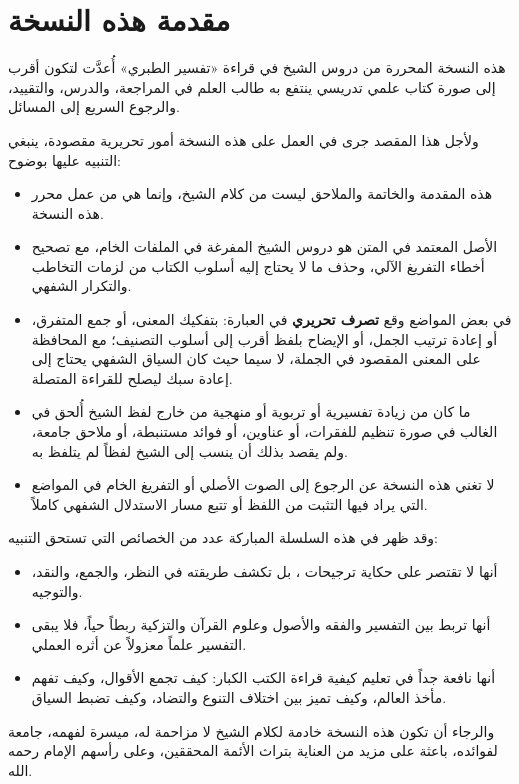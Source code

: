 \chapter*{مقدمة هذه النسخة}

هذه النسخة المحررة من دروس الشيخ  في قراءة «تفسير الطبري» أُعدَّت لتكون أقرب إلى صورة كتاب علمي تدريسي ينتفع به طالب العلم في المراجعة، والدرس، والتقييد، والرجوع السريع إلى المسائل.

ولأجل هذا المقصد جرى في العمل على هذه النسخة أمور تحريرية مقصودة، ينبغي التنبيه عليها بوضوح:
\begin{itemize}
    \item هذه المقدمة والخاتمة والملاحق ليست من كلام الشيخ، وإنما هي من عمل محرر هذه النسخة.
    \item الأصل المعتمد في المتن هو دروس الشيخ المفرغة في الملفات الخام، مع تصحيح أخطاء التفريغ الآلي، وحذف ما لا يحتاج إليه أسلوب الكتاب من لزمات التخاطب والتكرار الشفهي.
    \item في بعض المواضع وقع \textbf{تصرف تحريري} في العبارة: بتفكيك المعنى، أو جمع المتفرق، أو إعادة ترتيب الجمل، أو الإيضاح بلفظ أقرب إلى أسلوب التصنيف؛ مع المحافظة على المعنى المقصود في الجملة، لا سيما حيث كان السياق الشفهي يحتاج إلى إعادة سبك ليصلح للقراءة المتصلة.
    \item ما كان من زيادة تفسيرية أو تربوية أو منهجية من خارج لفظ الشيخ أُلحق في الغالب في صورة تنظيم للفقرات، أو عناوين، أو فوائد مستنبطة، أو ملاحق جامعة، ولم يقصد بذلك أن ينسب إلى الشيخ لفظاً لم يتلفظ به.
    \item لا تغني هذه النسخة عن الرجوع إلى الصوت الأصلي أو التفريغ الخام في المواضع التي يراد فيها التثبت من اللفظ أو تتبع مسار الاستدلال الشفهي كاملاً.
\end{itemize}

وقد ظهر في هذه السلسلة المباركة عدد من الخصائص التي تستحق التنبيه:
\begin{itemize}
    \item أنها لا تقتصر على حكاية ترجيحات ، بل تكشف طريقته في النظر، والجمع، والنقد، والتوجيه.
    \item أنها تربط بين التفسير والفقه والأصول وعلوم القرآن والتزكية ربطاً حياً، فلا يبقى التفسير علماً معزولاً عن أثره العملي.
    \item أنها نافعة جداً في تعليم كيفية قراءة الكتب الكبار: كيف تجمع الأقوال، وكيف تفهم مأخذ العالم، وكيف تميز بين اختلاف التنوع والتضاد، وكيف تضبط السياق.
\end{itemize}

والرجاء أن تكون هذه النسخة خادمة لكلام الشيخ لا مزاحمة له، ميسرة لفهمه، جامعة لفوائده، باعثة على مزيد من العناية بتراث الأئمة المحققين، وعلى رأسهم الإمام  رحمه الله.

